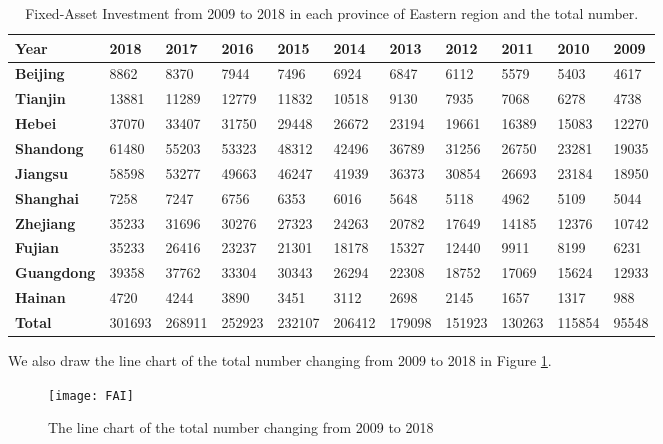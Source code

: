 \documentclass{apmcmthesis}
\begin{document}
\begin{table}[h]
\scriptsize
\centering
\caption{Fixed-Asset Investment from 2009 to 2018 in each province of Eastern region and the total number.} 
\begin{tabular}{p{1cm}<{\centering}p{1cm}<{\centering}p{1cm}<{\centering}p{1cm}<{\centering}p{1cm}<{\centering}p{1cm}<{\centering}p{1cm}<{\centering}p{1cm}<{\centering}p{1cm}<{\centering}p{1cm}<{\centering}p{1cm}<{\centering}}
\toprule
  \textbf{Year} &\textbf{2018} & \textbf{2017} & \textbf{2016} & \textbf{2015} & \textbf{2014} & \textbf{2013} & \textbf{2012} & \textbf{2011} & \textbf{2010} & \textbf{2009}  \\
\midrule
   \textbf{Beijing} & 8862  & 8370  & 7944  & 7496  & 6924  & 6847  & 6112  & 5579  & 5403  & 4617 \\
   \textbf{Tianjin} & 13881  & 11289  & 12779  & 11832  & 10518  & 9130  & 7935  & 7068  & 6278  & 4738 \\
   \textbf{Hebei}   & 37070  & 33407  & 31750  & 29448  & 26672  & 23194  & 19661  & 16389  & 15083  & 12270   \\
   \textbf{Shandong}& 61480  & 55203  & 53323  & 48312  & 42496  & 36789  & 31256  & 26750  & 23281  & 19035 \\
   \textbf{Jiangsu} & 58598  & 53277  & 49663  & 46247  & 41939  & 36373  & 30854  & 26693  & 23184  & 18950    \\
   \textbf{Shanghai}& 7258  & 7247  & 6756  & 6353  & 6016  & 5648  & 5118  & 4962  & 5109  & 5044 \\
   \textbf{Zhejiang}& 35233  & 31696  & 30276  & 27323  & 24263  & 20782  & 17649  & 14185  & 12376  & 10742 \\
   \textbf{Fujian}  & 35233  & 26416  & 23237  & 21301  & 18178  & 15327  & 12440  & 9911  & 8199  & 6231   \\
   \textbf{Guangdong}& 39358  & 37762  & 33304  & 30343  & 26294  & 22308  & 18752  & 17069  & 15624  & 12933   \\
   \textbf{Hainan}  & 4720  & 4244  & 3890  & 3451  & 3112  & 2698  & 2145  & 1657  & 1317  & 988   \\
   \textbf{Total} & 301693  & 268911  & 252923  & 232107  & 206412  & 179098  & 151923  & 130263  & 115854  & 95548\\
\bottomrule
\end{tabular}\label{tabel6}
\end{table}

We also draw the line chart of the total number changing from 2009 to 2018 in Figure \ref{FAI}.
\begin{figure}[h]
  \centering
  \texttt{[image: FAI]}
  \caption{The line chart of the total number changing from 2009 to 2018}\label{FAI}
\end{figure}
\end{document}
